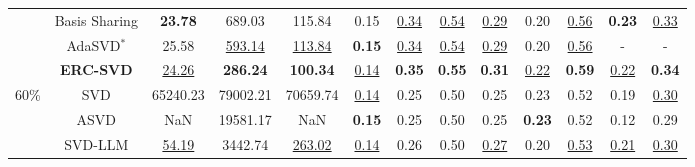 \begin{table}[t]
{\begin{tabular}{c|c|ccc|cccccccc}
                               & \cellcolor{white} Basis Sharing & \cellcolor{white} \textbf{23.78} & \cellcolor{white} 689.03 & \cellcolor{white} 115.84 & \cellcolor{white} 0.15 & \cellcolor{white} \underline{0.34} & \cellcolor{white} \underline{0.54} & \cellcolor{white} \underline{0.29} & \cellcolor{white} 0.20 & \cellcolor{white} \underline{0.56} & \cellcolor{white} \textbf{0.23} & \cellcolor{white} \underline{0.33} \\

                               & \cellcolor{white} AdaSVD$^{*}$ & \cellcolor{white} 25.58 & \cellcolor{white} \underline{593.14} & \cellcolor{white} \underline{113.84}  & \cellcolor{white} \textbf{0.15} & \cellcolor{white} \underline{0.34} & \cellcolor{white} \underline{0.54} & \cellcolor{white} \underline{0.29} & \cellcolor{white} 0.20 & \cellcolor{white} \underline{0.56} & \cellcolor{white} - & \cellcolor{white} -\\
        \cmidrule{2-13}      
                               & \cellcolor{cyan!10} \textbf{ERC-SVD} & \cellcolor{cyan!10} \underline{24.26} & \cellcolor{cyan!10} \textbf{286.24} & \cellcolor{cyan!10} \textbf{100.34} & \cellcolor{cyan!10} \underline{0.14} & \cellcolor{cyan!10} \textbf{0.35} & \cellcolor{cyan!10} \textbf{0.55} & \cellcolor{cyan!10} \textbf{0.31} & \cellcolor{cyan!10} \underline{0.22} & \cellcolor{cyan!10} \textbf{0.59} & \cellcolor{cyan!10} \underline{0.22} & \cellcolor{cyan!10} \textbf{0.34} \\
    \midrule
        \multirow{6}{*}{60\%}  & \cellcolor{white} SVD & \cellcolor{white} 65240.23 & \cellcolor{white} 79002.21 & \cellcolor{white} 70659.74 & \cellcolor{white} \underline{0.14} & \cellcolor{white} 0.25 & \cellcolor{white} 0.50 & \cellcolor{white} 0.25 & \cellcolor{white} 0.23 & \cellcolor{white} 0.52 & \cellcolor{white} 0.19 & \cellcolor{white} \underline{0.30}\\

                               & \cellcolor{white} ASVD & \cellcolor{white} NaN & \cellcolor{white} 19581.17 & \cellcolor{white} NaN & \cellcolor{white} \textbf{0.15} & \cellcolor{white} 0.25 & \cellcolor{white} 0.50 & \cellcolor{white} 0.25 & \cellcolor{white} \textbf{0.23} & \cellcolor{white} 0.52 & \cellcolor{white} 0.12 & \cellcolor{white} 0.29\\
        
                               & \cellcolor{white} SVD-LLM & \cellcolor{white} \underline{54.19} & \cellcolor{white} 3442.74 & \cellcolor{white} \underline{263.02} & \cellcolor{white} \underline{0.14} & \cellcolor{white} 0.26 & \cellcolor{white} 0.50 & \cellcolor{white} \underline{0.27} & \cellcolor{white} 0.20 & \cellcolor{white} \underline{0.53} & \cellcolor{white} \underline{0.21} & \cellcolor{white} \underline{0.30}\\


\end{tabular}}
\end{table}
